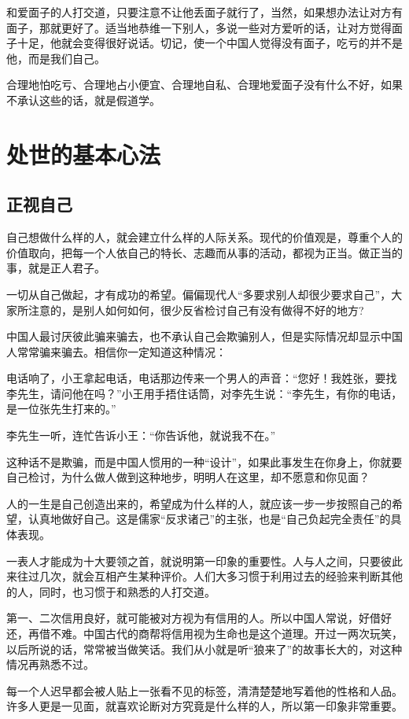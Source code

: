 \documentclass[fontset=fandol, a4paper, 12pt, openright]{ctexbook}
\begin{document}
和爱面子的人打交道，只要注意不让他丢面子就行了，当然，如果想办法让对方有面子，那就更好了。适当地恭维一下别人，多说一些对方爱听的话，让对方觉得面子十足，他就会变得很好说话。切记，使一个中国人觉得没有面子，吃亏的并不是他，而是我们自己。

合理地怕吃亏、合理地占小便宜、合理地自私、合理地爱面子没有什么不好，如果不承认这些的话，就是假道学。

\part{处世的基本心法}

\chapter{正视自己}
自己想做什么样的人，就会建立什么样的人际关系。现代的价值观是，尊重个人的价值取向，把每一个人依自己的特长、志趣而从事的活动，都视为正当。做正当的事，就是正人君子。

一切从自己做起，才有成功的希望。偏偏现代人“多要求别人却很少要求自己”，大家所注意的，是别人如何如何，很少反省检讨自己有没有做得不好的地方?

中国人最讨厌彼此骗来骗去，也不承认自己会欺骗别人，但是实际情况却显示中国人常常骗来骗去。相信你一定知道这种情况：

电话响了，小王拿起电话，电话那边传来一个男人的声音：“您好！我姓张，要找李先生，请问他在吗？”小王用手捂住话筒，对李先生说：“李先生，有你的电话，是一位张先生打来的。”

李先生一听，连忙告诉小王：“你告诉他，就说我不在。”

这种话不是欺骗，而是中国人惯用的一种“设计”，如果此事发生在你身上，你就要自己检讨，为什么做人做到这种地步，明明人在这里，却不愿意和你见面？

人的一生是自己创造出来的，希望成为什么样的人，就应该一步一步按照自己的希望，认真地做好自己。这是儒家“反求诸己”的主张，也是“自己负起完全责任”的具体表现。

一表人才能成为十大要领之首，就说明第一印象的重要性。人与人之间，只要彼此来往过几次，就会互相产生某种评价。人们大多习惯于利用过去的经验来判断其他的人，同时，也习惯于和熟悉的人打交道。

第一、二次信用良好，就可能被对方视为有信用的人。所以中国人常说，好借好还，再借不难。中国古代的商帮将信用视为生命也是这个道理。开过一两次玩笑，以后所说的话，常常被当做笑话。我们从小就是听“狼来了”的故事长大的，对这种情况再熟悉不过。

每一个人迟早都会被人贴上一张看不见的标签，清清楚楚地写着他的性格和人品。许多人更是一见面，就喜欢论断对方究竟是什么样的人，所以第一印象非常重要。
\end{document}
